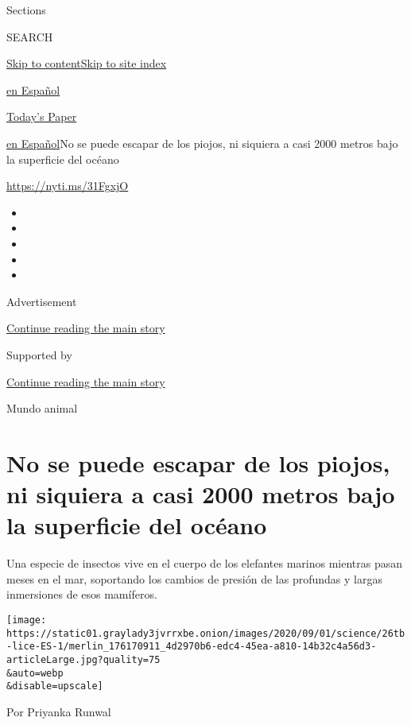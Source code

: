 Sections

SEARCH

\protect\hyperlink{site-content}{Skip to
content}\protect\hyperlink{site-index}{Skip to site index}

\href{https://www.nytimes3xbfgragh.onion/es/}{en Español}

\href{https://myaccount.nytimes3xbfgragh.onion/auth/login?response_type=cookie\&client_id=vi}{}

\href{https://www.nytimes3xbfgragh.onion/section/todayspaper}{Today's
Paper}

\href{/es/}{en Español}\textbar{}No se puede escapar de los piojos, ni
siquiera a casi 2000 metros bajo la superficie del océano

\url{https://nyti.ms/31FgxjO}

\begin{itemize}
\item
\item
\item
\item
\item
\end{itemize}

Advertisement

\protect\hyperlink{after-top}{Continue reading the main story}

Supported by

\protect\hyperlink{after-sponsor}{Continue reading the main story}

Mundo animal

\hypertarget{no-se-puede-escapar-de-los-piojos-ni-siquiera-a-casi-2000-metros-bajo-la-superficie-del-ocuxe9ano}{%
\section{No se puede escapar de los piojos, ni siquiera a casi 2000
metros bajo la superficie del
océano}\label{no-se-puede-escapar-de-los-piojos-ni-siquiera-a-casi-2000-metros-bajo-la-superficie-del-ocuxe9ano}}

Una especie de insectos vive en el cuerpo de los elefantes marinos
mientras pasan meses en el mar, soportando los cambios de presión de las
profundas y largas inmersiones de esos mamíferos.

\texttt{[image: https://static01.graylady3jvrrxbe.onion/images/2020/09/01/science/26tb-lice-ES-1/merlin\_176170911\_4d2970b6-edc4-45ea-a810-14b32c4a56d3-articleLarge.jpg?quality=75\\\&auto=webp\\\&disable=upscale]}

Por Priyanka Runwal

